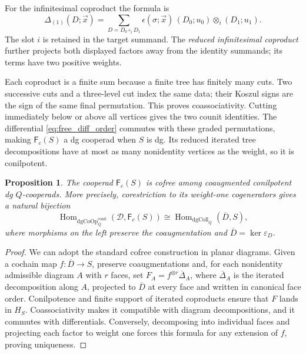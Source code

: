 \documentclass[11pt,letterpaper]{article}
\numberwithin{equation}{section}
\theoremstyle{plain}
\newtheorem{prop}[thm]{Proposition}
\theoremstyle{definition}
\theoremstyle{remark}
\begin{document}
For the infinitesimal coproduct the formula is
\begin{equation*} \Delta_{(1)}(D;\vec x)=
 \sum_{D=D_0\circ_iD_1}\epsilon(\sigma;\vec x)\,(D_0;u_0)\otimes_i(D_1;u_1).
\end{equation*}
The slot $i$ is retained in the target summand.
The \textit{reduced infinitesimal coproduct} further projects both displayed factors away
from the identity summands; its terms have two positive weights.

Each coproduct is a finite sum because a finite tree has finitely many
cuts. Two successive cuts and a three-level cut index the same data;
their Koszul signs are the sign of the same final permutation. This
proves coassociativity. Cutting immediately below or above all vertices
gives the two counit identities. The differential
\eqref{eq:free_diff_order} commutes with these graded permutations,
making $\mathsf F_c(S)$ a dg cooperad when $S$ is dg. Its reduced
iterated tree decompositions have at most as many nonidentity vertices
as the weight, so it is conilpotent.

\begin{prop}\label{prop_cofree_Q_cooperad}
The cooperad $\mathsf F_c(S)$ is cofree among coaugmented conilpotent
dg $Q$-cooperads. More precisely, corestriction to its weight-one
cogenerators gives a natural bijection
\[
 \operatorname{Hom}_{\mathrm{dgCoOp}^{\mathrm{conil}}_Q}
   (\mathscr D,\mathsf F_c(S))
 \cong\operatorname{Hom}_{\mathrm{dgColl}_Q}(\overline D,S),
\]
where morphisms on the left preserve the coaugmentation and
$\overline D=\ker\varepsilon_D$.
\end{prop}
\begin{proof}
We can adopt the standard cofree construction
\cite[Theorem~5.8.3 and \S~5.9.17]{loday2012algebraic} in planar
diagrams. Given a cochain map $f:\overline D\to S$, preserve
coaugmentations and, for each nonidentity admissible diagram $A$
with $r$ faces, set
$ F_A=f^{\otimes r}\overline\Delta_A$,
where $\overline\Delta_A$ is the iterated decomposition along $A$,
projected to $\overline D$ at every face and written in canonical
face order.
Conilpotence and finite support of iterated coproducts ensure that
$F$ lands in $H_S$. Coassociativity makes it compatible with diagram
decompositions, and it commutes with differentials. Conversely,
decomposing into individual faces and projecting each factor to
weight one forces this formula for any extension of $f$, proving
uniqueness.
\end{proof}
\end{document}
